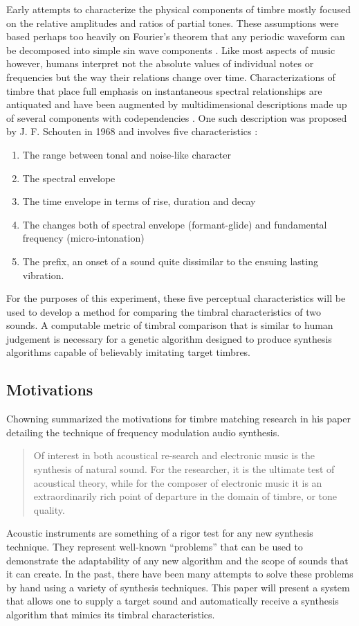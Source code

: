 \documentclass[12pt]{article}
\begin{document}
Early attempts to characterize the physical components of timbre mostly focused on the relative amplitudes and ratios of partial tones. These assumptions were based perhaps too heavily on Fourier's theorem that any periodic waveform can be decomposed into simple sin wave components \citep{helmholtz1857physiological, helmholtz1954sensations}. Like most aspects of music however, humans interpret not the absolute values of individual notes or frequencies but the way their relations change over time. Characterizations of timbre that place full emphasis on instantaneous spectral relationships are antiquated and have been augmented by multidimensional descriptions made up of several components with codependencies \citep{erickson1975sound}. One such description was proposed by J. F. Schouten in 1968 and involves five characteristics \citep{schouten1968perception, erickson1975sound}:
\begin{enumerate}
\item
The range between tonal and noise-like character
\item
The spectral envelope
\item
The time envelope in terms of rise, duration and decay
\item
The changes both of spectral envelope (formant-glide) and fundamental frequency (micro-intonation)
\item
The prefix, an onset of a sound quite dissimilar to the ensuing lasting vibration.
\end{enumerate}

For the purposes of this experiment, these five perceptual characteristics will be used to develop a method for comparing the timbral characteristics of two sounds. A computable metric of timbral comparison that is similar to human judgement is necessary for a genetic algorithm designed to produce synthesis algorithms capable of believably imitating target timbres.

\subsection{Motivations}
Chowning summarized the motivations for timbre matching research in his paper detailing the technique of frequency modulation audio synthesis.
\begin{quote}
Of interest in both acoustical re-search and electronic music is the synthesis of natural sound. For the researcher, it is the ultimate test of acoustical theory, while for the composer of electronic music it is an extraordinarily rich point of departure in the domain of timbre, or tone quality. \citep{chowning1973synthesis}
\end{quote}
Acoustic instruments are something of a rigor test for any new synthesis technique. They represent well-known ``problems'' that can be used to demonstrate the adaptability of any new algorithm and the scope of sounds that it can create. In the past, there have been many attempts to solve these problems by hand using a variety of synthesis techniques. This paper will present a system that allows one to supply a target sound and automatically receive a synthesis algorithm that mimics its timbral characteristics.
\end{document}
